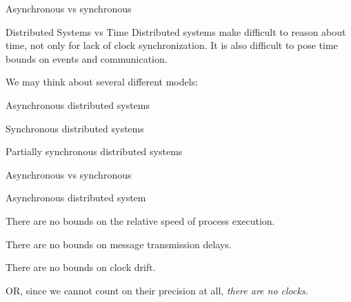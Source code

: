 \begin{frame}{Asynchronous vs synchronous}

\begin{block}{Distributed Systems vs Time}
Distributed systems make difficult to reason about time, not only for lack
of clock synchronization. It is also difficult to pose time bounds on 
events and communication.
\end{block}

\bigskip
We may think about several different models:
\BIL
\item \alert{Asynchronous} distributed systems 
\item \alert{Synchronous} distributed systems 
\item \alert{Partially synchronous} distributed systems
\EIL



\end{frame}

\begin{frame}{Asynchronous vs synchronous}

\begin{block}{Asynchronous distributed system}
\BI
\item There are no bounds on the relative speed of process execution.
\item There are no bounds on message transmission delays.
\item There are no bounds on clock drift.
\BI
\item OR, since we cannot count on their precision at all, {\em there are no clocks}.
\EI
\EI
\end{block}

\end{frame}

